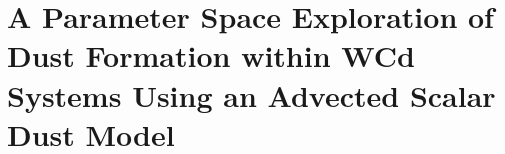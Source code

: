 \chapter{A Parameter Space Exploration of Dust Formation within WCd Systems Using an Advected Scalar Dust Model}